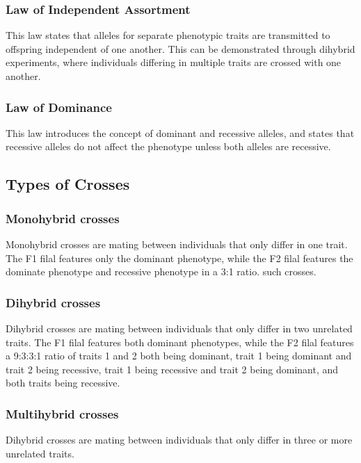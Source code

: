 \documentclass[12pt,titlepage]{article}
\begin{document}
        \subsubsection{Law of Independent Assortment}
          This law states that alleles for separate phenotypic traits are transmitted to offspring independent of one another. This can be demonstrated
          through dihybrid experiments, where individuals differing in multiple traits are crossed with one another.

        \subsubsection{Law of Dominance}
          This law introduces the concept of dominant and recessive alleles, and states that recessive alleles do not affect the phenotype unless
          both alleles are recessive.

      \subsection{Types of Crosses}
        \subsubsection{Monohybrid crosses}
          Monohybrid crosses are mating between individuals that only differ in one trait. The F1 filal features only the dominant phenotype, while
          the F2 filal features the dominate phenotype and recessive phenotype in a 3:1 ratio.
          such crosses.

        \subsubsection{Dihybrid crosses}
          Dihybrid crosses are mating between individuals that only differ in two unrelated traits. The F1 filal features both dominant phenotypes, while
          the F2 filal features a 9:3:3:1 ratio of traits 1 and 2 both being dominant, trait 1 being dominant and trait 2 being recessive,
          trait 1 being recessive and trait 2 being dominant, and both traits being recessive.

        \subsubsection{Multihybrid crosses}
          Dihybrid crosses are mating between individuals that only differ in three or more unrelated traits.
\end{document}

